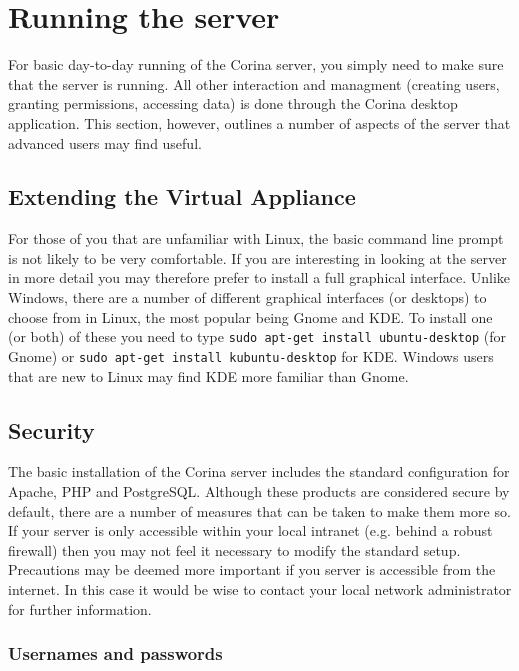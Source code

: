 
\chapter{Running the server}
\label{txt:servermaintenance}

For basic day-to-day running of the Corina server, you simply need to make sure that the server is running.  All other interaction and managment (creating users, granting permissions, accessing data) is done through the Corina desktop application.  This section, however, outlines a number of aspects of the server that advanced users may find useful.

\section{Extending the Virtual Appliance}

For those of you that are unfamiliar with Linux, the basic command line prompt is not likely to be very comfortable.  If you are interesting in looking at the server in more detail you may therefore prefer to install a full graphical interface.  Unlike Windows, there are a number of different graphical interfaces (or desktops) to choose from in Linux, the most popular being Gnome and KDE.  To install one (or both) of these you need to type \verb|sudo apt-get install ubuntu-desktop| (for Gnome) or \verb|sudo apt-get install kubuntu-desktop| for KDE.  Windows users that are new to Linux may find KDE more familiar than Gnome.

\section{Security}

The basic installation of the Corina server includes the standard configuration for Apache, PHP and PostgreSQL.  Although these products are considered secure by default, there are a number of measures that can be taken to make them more so.  If your server is only accessible within your local intranet (e.g. behind a robust firewall) then you may not feel it necessary to modify the standard setup.  Precautions may be deemed more important if you server is accessible from the internet.  In this case it would be wise to contact your local network administrator for further information.

\subsection{Usernames and passwords}


